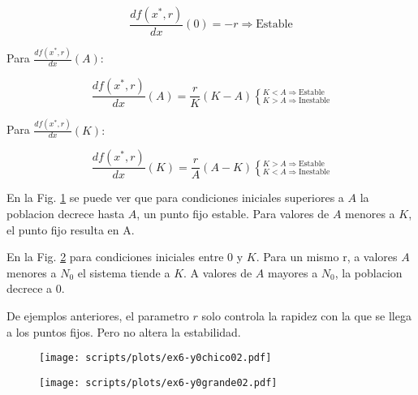\documentclass[twocolumn,aps,prl]{revtex4-1}
\begin{document}
$$\frac{d f\left(x^{*}, r\right)}{d x} (0) = -r \Rightarrow \text{Estable}$$ 

Para $\frac{d f\left(x^{*}, r\right)}{d x} (A):$ 

$$\frac{d f\left(x^{*}, r\right)}{d x} (A) = \frac{r}{K} (K-A)  
\left\lbrace
^{ K<A \Rightarrow \text{Estable}}
_{ K>A \Rightarrow \text{Inestable}} \right.$$ 

Para $\frac{d f\left(x^{*}, r\right)}{d x} (K):$ 

$$\frac{d f\left(x^{*}, r\right)}{d x} (K) = \frac{r}{A} (A-K) 
\left\lbrace ^{ K>A \Rightarrow \text{Estable}}
_{ K<A \Rightarrow \text{Inestable}} \right. $$ 

En la Fig. \ref{fig:scripts/plots/ex6-y0chico02} se puede ver que para condiciones iniciales superiores a $A$ la poblacion decrece hasta $A$, un punto fijo estable. Para valores de $A$ menores a $K$, el punto fijo resulta en A.

En la Fig. \ref{fig:scripts/plots/ex6-y0grande02} para condiciones iniciales entre 0 y $K$. Para un mismo r, a valores $A$ menores a $N_0$ el sistema tiende a $K$. A valores de $A$ mayores a $N_0$, la poblacion decrece a 0. 

De ejemplos anteriores, el parametro $r$ solo controla la rapidez con la que se llega a los puntos fijos. Pero no altera la estabilidad.

\begin{figure*}[ht!]
    \centering
    \begin{subfigure}[b]{0.9\linewidth}
        \centering
        \texttt{[image: scripts/plots/ex6-y0chico02.pdf]}
        \caption{}
        \label{fig:scripts/plots/ex6-y0chico02}
    \end{subfigure}\quad
    \begin{subfigure}[b]{0.9\linewidth}
        \centering
        \texttt{[image: scripts/plots/ex6-y0grande02.pdf]}
        \caption{}
        \label{fig:scripts/plots/ex6-y0grande02}
    \end{subfigure}
    \caption{Graficos de la solucion de la Ec. !!! para $r=0.1$ y distintos valores de $A$.}
\end{figure*}


\end{document}
